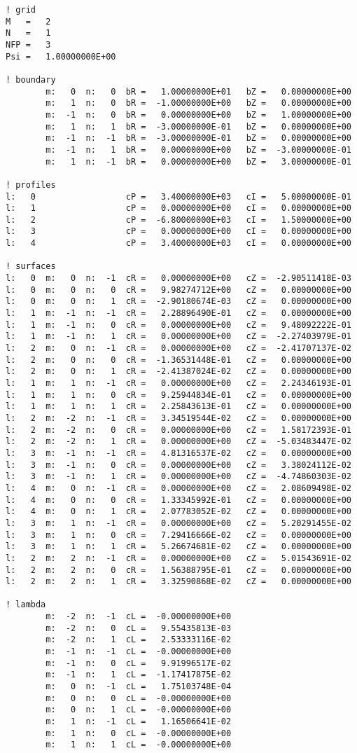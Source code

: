 \documentclass[10pt,a4paper]{article}
\begin{document}
\begin{lstlisting}
! grid
M	=   2
N	=   1
NFP	=   3
Psi	=   1.00000000E+00

! boundary
		m:   0	n:   0	bR =   1.00000000E+01	bZ =   0.00000000E+00
		m:   1	n:   0	bR =  -1.00000000E+00	bZ =   0.00000000E+00
		m:  -1	n:   0	bR =   0.00000000E+00	bZ =   1.00000000E+00
		m:   1	n:   1	bR =  -3.00000000E-01	bZ =   0.00000000E+00
		m:  -1	n:  -1	bR =  -3.00000000E-01	bZ =   0.00000000E+00
		m:  -1	n:   1	bR =   0.00000000E+00	bZ =  -3.00000000E-01
		m:   1	n:  -1	bR =   0.00000000E+00	bZ =   3.00000000E-01

! profiles
l:   0					cP =   3.40000000E+03	cI =   5.00000000E-01
l:   1					cP =   0.00000000E+00	cI =   0.00000000E+00
l:   2					cP =  -6.80000000E+03	cI =   1.50000000E+00
l:   3					cP =   0.00000000E+00	cI =   0.00000000E+00
l:   4					cP =   3.40000000E+03	cI =   0.00000000E+00

! surfaces
l:   0	m:   0	n:  -1	cR =   0.00000000E+00	cZ =  -2.90511418E-03
l:   0	m:   0	n:   0	cR =   9.98274712E+00	cZ =   0.00000000E+00
l:   0	m:   0	n:   1	cR =  -2.90180674E-03	cZ =   0.00000000E+00
l:   1	m:  -1	n:  -1	cR =   2.28896490E-01	cZ =   0.00000000E+00
l:   1	m:  -1	n:   0	cR =   0.00000000E+00	cZ =   9.48092222E-01
l:   1	m:  -1	n:   1	cR =   0.00000000E+00	cZ =  -2.27403979E-01
l:   2	m:   0	n:  -1	cR =   0.00000000E+00	cZ =  -2.41707137E-02
l:   2	m:   0	n:   0	cR =  -1.36531448E-01	cZ =   0.00000000E+00
l:   2	m:   0	n:   1	cR =  -2.41387024E-02	cZ =   0.00000000E+00
l:   1	m:   1	n:  -1	cR =   0.00000000E+00	cZ =   2.24346193E-01
l:   1	m:   1	n:   0	cR =   9.25944834E-01	cZ =   0.00000000E+00
l:   1	m:   1	n:   1	cR =   2.25843613E-01	cZ =   0.00000000E+00
l:   2	m:  -2	n:  -1	cR =   3.34519544E-02	cZ =   0.00000000E+00
l:   2	m:  -2	n:   0	cR =   0.00000000E+00	cZ =   1.58172393E-01
l:   2	m:  -2	n:   1	cR =   0.00000000E+00	cZ =  -5.03483447E-02
l:   3	m:  -1	n:  -1	cR =   4.81316537E-02	cZ =   0.00000000E+00
l:   3	m:  -1	n:   0	cR =   0.00000000E+00	cZ =   3.38024112E-02
l:   3	m:  -1	n:   1	cR =   0.00000000E+00	cZ =  -4.74860303E-02
l:   4	m:   0	n:  -1	cR =   0.00000000E+00	cZ =   2.08609498E-02
l:   4	m:   0	n:   0	cR =   1.33345992E-01	cZ =   0.00000000E+00
l:   4	m:   0	n:   1	cR =   2.07783052E-02	cZ =   0.00000000E+00
l:   3	m:   1	n:  -1	cR =   0.00000000E+00	cZ =   5.20291455E-02
l:   3	m:   1	n:   0	cR =   7.29416666E-02	cZ =   0.00000000E+00
l:   3	m:   1	n:   1	cR =   5.26674681E-02	cZ =   0.00000000E+00
l:   2	m:   2	n:  -1	cR =   0.00000000E+00	cZ =   5.01543691E-02
l:   2	m:   2	n:   0	cR =   1.56388795E-01	cZ =   0.00000000E+00
l:   2	m:   2	n:   1	cR =   3.32590868E-02	cZ =   0.00000000E+00

! lambda
		m:  -2	n:  -1	cL =  -0.00000000E+00
		m:  -2	n:   0	cL =   9.55435813E-03
		m:  -2	n:   1	cL =   2.53333116E-02
		m:  -1	n:  -1	cL =  -0.00000000E+00
		m:  -1	n:   0	cL =   9.91996517E-02
		m:  -1	n:   1	cL =  -1.17417875E-02
		m:   0	n:  -1	cL =   1.75103748E-04
		m:   0	n:   0	cL =  -0.00000000E+00
		m:   0	n:   1	cL =  -0.00000000E+00
		m:   1	n:  -1	cL =   1.16506641E-02
		m:   1	n:   0	cL =  -0.00000000E+00
		m:   1	n:   1	cL =  -0.00000000E+00
\end{lstlisting}
\end{document}
